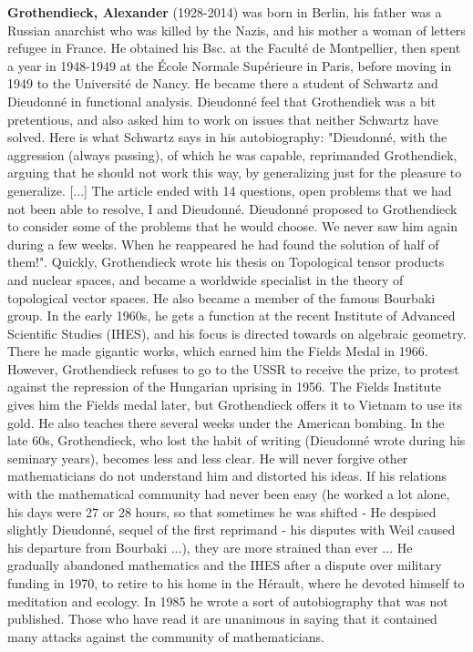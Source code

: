 \textbf{Grothendieck, Alexander} (1928-2014) was born in Berlin, his father was a Russian anarchist who was killed by the Nazis, and his mother a woman of letters refugee in France. He obtained his Bsc. at the Faculté de Montpellier, then spent a year in 1948-1949 at the École Normale Supérieure in Paris, before moving in 1949 to the Université de Nancy. He became there a student of Schwartz and Dieudonné in functional analysis. Dieudonné feel that Grothendiek was a bit pretentious, and also asked him to work on issues that neither Schwartz have solved. Here is what Schwartz says in his autobiography: "Dieudonné, with the aggression (always passing), of which he was capable, reprimanded Grothendiek, arguing that he should not work this way, by generalizing just for the pleasure to generalize. [...] The article ended with 14 questions, open problems that we had not been able to resolve, I and Dieudonné. Dieudonné proposed to Grothendieck to consider some of the problems that he would choose. We never saw him again during a few weeks. When he reappeared he had found the solution of half of them!". Quickly, Grothendieck wrote his thesis on Topological tensor products and nuclear spaces, and became a worldwide specialist in the theory of topological vector spaces. He also became a member of the famous Bourbaki group. In the early 1960s, he gets a function at the recent Institute of Advanced Scientific Studies (IHES), and his focus is directed towards on algebraic geometry. There he made gigantic works, which earned him the Fields Medal in 1966. However, Grothendieck refuses to go to the USSR to receive the prize, to protest against the repression of the Hungarian uprising in 1956. The Fields Institute gives him the Fields medal later, but Grothendieck offers it to Vietnam to use its gold. He also teaches there several weeks under the American bombing. In the late 60s, Grothendieck, who lost the habit of writing (Dieudonné wrote during his seminary years), becomes less and less clear. He will never forgive other mathematicians do not understand him and distorted his ideas. If his relations with the mathematical community had never been easy (he worked a lot alone, his days were 27 or 28 hours, so that sometimes he was shifted - He despised slightly Dieudonné, sequel of the first reprimand - his disputes with Weil caused his departure from Bourbaki ...), they are more strained than ever ... He gradually abandoned mathematics and the IHES after a dispute over military funding in 1970, to retire to his home in the Hérault, where he devoted himself to meditation and ecology. In 1985 he wrote a sort of autobiography that was not published. Those who have read it are unanimous in saying that it contained many attacks against the community of mathematicians.

